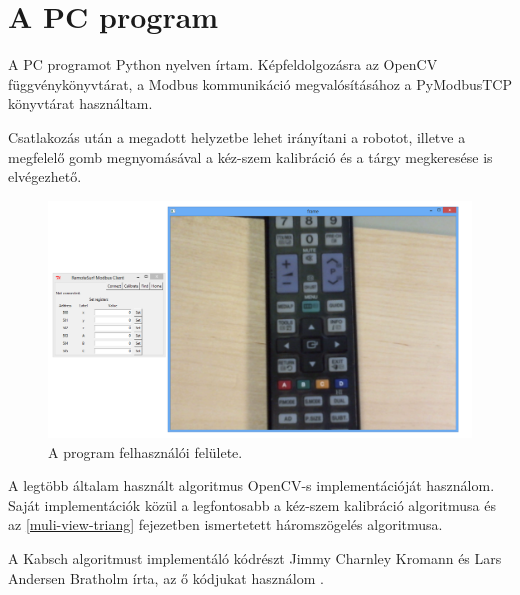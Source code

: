 	\section{A PC program}
	
	A PC programot Python nyelven írtam. Képfeldolgozásra az OpenCV függvénykönyvtárat, a Modbus kommunikáció megvalósításához a PyModbusTCP könyvtárat használtam.

	Csatlakozás után a megadott helyzetbe lehet irányítani a robotot, illetve a megfelelő gomb megnyomásával a kéz-szem kalibráció és a tárgy megkeresése is elvégezhető.
	
\begin{figure}[H]
\centering
\includegraphics[width=\linewidth]{chapters/implementation/gui.png}
\caption{A program felhasználói felülete.}
\label{img-gui}
\end{figure}

	A legtöbb általam használt algoritmus OpenCV-s implementációját használom. Saját implementációk közül a legfontosabb a kéz-szem kalibráció algoritmusa és az \ref{muli-view-triang} fejezetben ismertetett háromszögelés algoritmusa. 
		
	A Kabsch algoritmust implementáló kódrészt Jimmy Charnley Kromann és Lars Andersen Bratholm írta, az ő kódjukat használom \cite{kabschGithub}.
	